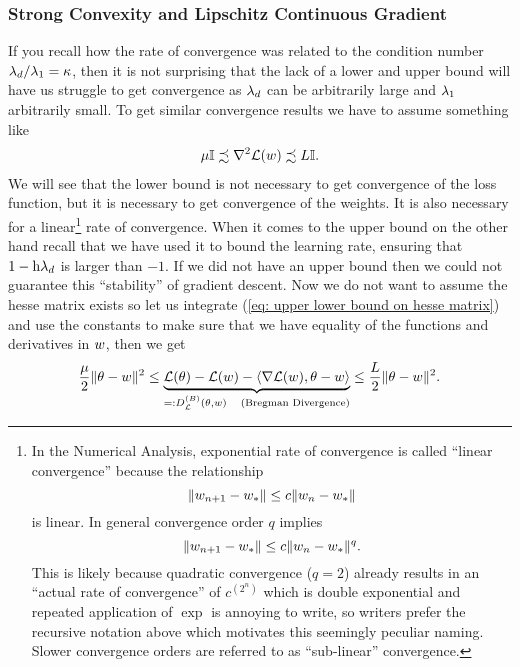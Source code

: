 \subsubsection{Strong Convexity and Lipschitz Continuous Gradient}

If you recall how the rate of convergence was related to the condition number
\(\lambda_d/\lambda_1 =\kappa\), then it is not surprising that
the lack of a lower and upper bound will have us struggle to get convergence as
\(\lambda_d\) can be arbitrarily large and \(\lambda_1\) arbitrarily
small. To get similar convergence results we have to assume something like
%
\begin{align}\label{eq: upper lower bound on hesse matrix}
	\mu \mathbb{I} \precsim \nabla^2 \mathcal{L}(w) \precsim L \mathbb{I}.
\end{align}
%
We will see that the lower bound is not necessary to get convergence of the
loss function, but it is necessary to get convergence of the weights. It is
also necessary for a linear\footnote{
	In the Numerical Analysis, exponential rate of
	convergence is called ``linear convergence'' because the relationship
	\[
		\|w_{n+1} - w_*\| \le c \|w_n - w_*\|
	\]
	is linear. In
	general convergence order \(q\) implies 
	\[
		\|w_{n+1} -w_*\| \le c\|w_n - w_*\|^q.
	\]
	This is likely because quadratic convergence (\(q=2\)) already results in an ``actual
	rate of convergence'' of \(c^{\left(2^n\right)}\) which is double exponential and
	repeated application of \(\exp\) is annoying to write, so writers prefer the
	recursive notation above which motivates this seemingly peculiar naming.
	Slower convergence orders are referred to as ``sub-linear'' convergence.
}
rate of convergence. When it comes to the upper bound on the other hand recall
that we have used it to bound the learning rate, ensuring that
\(1-\text{h}\lambda_d\) is larger than \(-1\). If we did not have an upper
bound then we could not guarantee this ``stability'' of gradient descent. Now
we do not want to assume the hesse matrix exists so let us integrate (\ref{eq:
upper lower bound on hesse matrix}) and use the constants to make sure that we
have equality of the functions and derivatives in \(w\), then we get
\begin{align}\label{eq: bregman divergence upper and lower bound}
	\frac{\mu}{2}\| \theta - w\|^2
	\le \underbrace{
		\mathcal{L}(\theta) - \mathcal{L}(w) - \langle \nabla \mathcal{L}(w), \theta-w\rangle
	}_{=:D^{(B)}_{\mathcal{L}}(\theta, w)\quad\text{(Bregman Divergence)}}
	\le \frac{L}{2}\| \theta - w\|^2.
\end{align}
